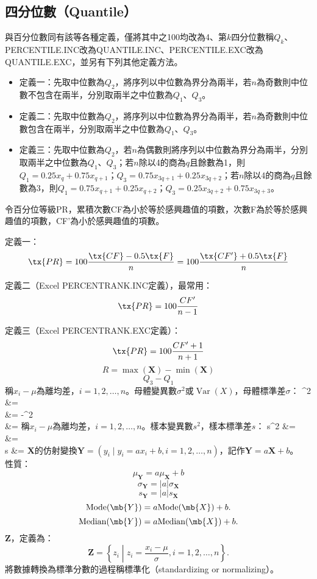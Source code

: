 \documentclass[a4paper,12pt]{report}
\begin{document}
\subsection{四分位數（Quantile）}
與百分位數同有該等各種定義，僅將其中之100均改為4、第$k$四分位數稱$Q_k$、PERCENTILE.INC改為QUANTILE.INC、PERCENTILE.EXC改為QUANTILE.EXC，並另有下列其他定義方法。\\
\begin{itemize}
\item 定義一：先取中位數為$Q_2$，將序列以中位數為界分為兩半，若$n$為奇數則中位數不包含在兩半，分別取兩半之中位數為$Q_1$、$Q_3$。
\item 定義二：先取中位數為$Q_2$，將序列以中位數為界分為兩半，若$n$為奇數則中位數包含在兩半，分別取兩半之中位數為$Q_1$、$Q_3$。
\item 定義三：先取中位數為$Q_2$，若$n$為偶數則將序列以中位數為界分為兩半，分別取兩半之中位數為$Q_1$、$Q_3$；若$n$除以4的商為$q$且餘數為1，則$Q_1=0.25x_q+0.75x_{q+1}$；$Q_3=0.75x_{3q+1}+0.25x_{3q+2}$；若$n$除以4的商為$q$且餘數為3，則$Q_1=0.75x_{q+1}+0.25x_{q+2}$；$Q_3=0.25x_{3q+2}+0.75x_{3q+3}$。
\end{itemize}
令百分位等級PR，累積次數CF為小於等於感興趣值的項數，次數F為於等於感興趣值的項數，CF'為小於感興趣值的項數。
\bit
\item 定義一：
\[\tx{PR}=100\frac{\tx{CF}-0.5\tx{F}}{n}=100\frac{\tx{CF'}+0.5\tx{F}}{n}\]
\item 定義二（Excel PERCENTRANK.INC定義），最常用：
\[\tx{PR} = 100\frac{CF'}{n-1}\]
\item 定義三（Excel PERCENTRANK.EXC定義）：
\[\tx{PR} = 100\frac{CF'+1}{n+1}\]
\eit
{}
\[R=\max(\mathbf{X})-\min(\mathbf{X})\]
\[Q_3-Q_1\]
稱$x_i-\mu$為離均差，$i=1,2,\ldots,n$。母體變異數$\sigma^2$或$\operatorname{Var}(X)$，母體標準差$\sigma$：
\bma
\sigma^2 &= \\
&= -\mu^2\\
\sigma &= 
\eam
{}
稱$x_i-\mu$為離均差，$i=1,2,\ldots,n$。樣本變異數$s^2$，樣本標準差$s$：
\bma
s^2 &= \\
&= \\
s &= 
\eam
{}
$\mathbf{X}$的仿射變換$\mathbf{Y}=(y_i\mid y_i=ax_i+b,i=1,2,\ldots,n)$，記作$\mathbf{Y}=a\mathbf{X}+b$。\\
性質：
\[\mu_\mathbf{Y}=a\mu_\mathbf{X}+b\]
\[\sigma_\mathbf{Y}=|a|\sigma_\mathbf{X}\]
\[s_\mathbf{Y}=|a|s_\mathbf{X}\]
\[\text{Mode}(\mb{Y})=a\text{Mode}(\mb{X})+b.\]
\[\text{Median}(\mb{Y})=a\text{Median}(\mb{X})+b.\]
$\mathbf{Z}$，定義為：
\[\mathbf{Z}=\left\{z_i\middle| z_i=\frac{x_i-\mu}{\sigma},i=1,2,\ldots,n\right\}.\]
將數據轉換為標準分數的過程稱標準化（standardizing or normalizing）。
\end{document}
